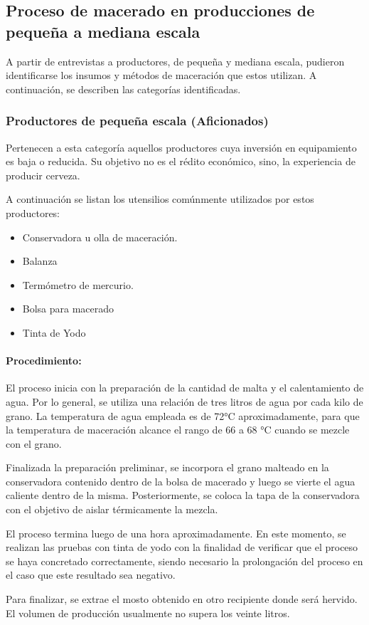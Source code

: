 	\subsection{Proceso de macerado en producciones de pequeña a mediana escala }
    
    \par
    A partir de entrevistas a productores, de pequeña y mediana escala, pudieron identificarse los insumos y métodos de maceración que estos utilizan. A continuación, se describen las categorías identificadas.
    
    \subsubsection{Productores de pequeña escala (Aficionados)}
    Pertenecen a esta categoría aquellos productores cuya inversión en equipamiento es baja o reducida. Su objetivo no es el rédito económico, sino, la experiencia de producir cerveza.
    \par
    A continuación se listan los utensilios comúnmente utilizados por estos productores: 
    \begin{itemize}
        \item Conservadora u olla de maceración.
        \item Balanza
        \item Termómetro de mercurio.
        \item Bolsa para macerado
        \item Tinta de Yodo
    \end{itemize}
    
    \paragraph{Procedimiento: } 
    El proceso inicia con la preparación de la cantidad de malta y el calentamiento de agua. Por lo general, se utiliza una relación de tres litros de agua por cada kilo de grano. La temperatura de agua empleada es de 72°C aproximadamente, para que la temperatura de maceración alcance el rango de 66 a 68 °C cuando se mezcle con el grano.
    \par
    Finalizada la preparación preliminar, se incorpora el grano malteado en la conservadora contenido dentro de la bolsa de macerado y luego se vierte el agua caliente dentro de la misma. Posteriormente, se coloca la tapa de la conservadora con el objetivo de aislar térmicamente la mezcla. 
    \par
    El proceso termina luego de una hora aproximadamente. En este momento, se realizan las pruebas con tinta de yodo con la finalidad de verificar que el proceso se haya concretado correctamente, siendo necesario la prolongación del proceso en el caso que este resultado sea negativo.
    \par 
    Para finalizar, se extrae el mosto obtenido en otro recipiente donde será hervido. El volumen de producción usualmente no supera los veinte litros.
    

